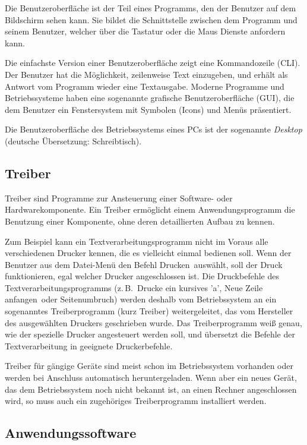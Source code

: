Die Benutzeroberfläche ist der Teil eines Programms, den der Benutzer auf dem
Bildschirm sehen kann. Sie bildet die Schnittstelle zwischen dem Programm und
seinem Benutzer, welcher über die Tastatur oder die Maus Dienste anfordern
kann.

Die einfachste Version einer Benutzeroberfläche zeigt eine Kommandozeile
(CLI). Der Benutzer hat die Möglichkeit, zeilenweise Text einzugeben, und
erhält als Antwort vom Programm wieder eine Textausgabe. Moderne Programme und
Betriebssysteme haben eine sogenannte grafische Benutzeroberfläche (GUI), die
dem Benutzer ein Fenstersystem mit Symbolen (Icons) und Menüs präsentiert.

Die Benutzeroberfläche des Betriebssystems eines PCs ist der sogenannte
\emph{Desktop} (deutsche Übersetzung: \glqq Schreibtisch\grqq ).


\subsection{Treiber}

Treiber sind Programme zur Ansteuerung einer Software- oder
Hardwarekomponente. Ein Treiber ermöglicht einem Anwendungsprogramm die
Benutzung einer Komponente, ohne deren detaillierten Aufbau zu kennen.

Zum Beispiel kann ein Textverarbeitungsprogramm nicht im Voraus alle
verschiedenen Drucker kennen, die es vielleicht einmal bedienen soll. Wenn der
Benutzer aus dem Datei-Menü den Befehl \glqq Drucken\grqq\ auswählt, soll der
Druck funktionieren, egal welcher Drucker angeschlossen ist. Die Druckbefehle
des Textverarbeitungsprogramms (z.\,B.\ \glqq Drucke ein kursives 'a'\grqq ,
\glqq Neue Zeile anfangen\grqq\ oder \glqq Seitenumbruch\grqq ) werden deshalb
vom Betriebssystem an ein sogenanntes Treiberprogramm (kurz Treiber)
weitergeleitet, das vom Hersteller des ausgewählten Druckers geschrieben wurde.
Das Treiberprogramm weiß genau, wie der spezielle Drucker angesteuert werden
soll, und übersetzt die Befehle der Textverarbeitung in geeignete
Druckerbefehle.

Treiber für gängige Geräte sind meist schon im Betriebssystem vorhanden oder
werden bei Anschluss automatisch heruntergeladen. Wenn aber ein neues Gerät,
das dem Betriebssystem noch nicht bekannt ist, an einen Rechner angeschlossen
wird, so muss auch ein zugehöriges Treiberprogramm installiert werden.


\subsection{Anwendungssoftware}

